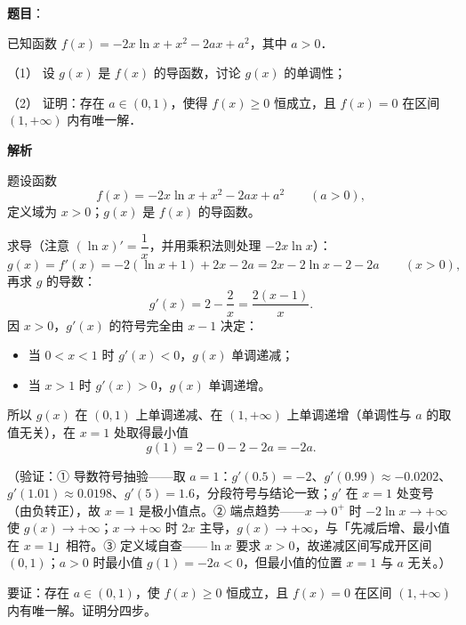 \begin{answer}

\textbf{题目}：

已知函数 \(f(x)=-2x\ln x+x^2-2ax+a^2\)，其中 \(a>0\)．

（1） 设 \(g(x)\) 是 \(f(x)\) 的导函数，讨论 \(g(x)\) 的单调性；

（2） 证明：存在 \(a\in(0,1)\)，使得 \(f(x)\geqslant 0\) 恒成立，且 \(f(x)=0\) 在区间 \((1,+\infty)\) 内有唯一解．

\textbf{解析}

题设函数
\nopagebreak[4]
\[
f(x)=-2x\ln x+x^{2}-2ax+a^{2}\qquad(a>0),
\]
定义域为 \(x>0\)；\(g(x)\) 是 \(f(x)\) 的导函数。


求导（注意 \((\ln x)'=\dfrac{1}{x}\)，并用乘积法则处理 \(-2x\ln x\)）：
\nopagebreak[4]
\[
g(x)=f'(x)=-2(\ln x+1)+2x-2a=2x-2\ln x-2-2a\qquad(x>0),
\]
再求 \(g\) 的导数：
\nopagebreak[4]
\[
g'(x)=2-\frac{2}{x}=\frac{2(x-1)}{x}.
\]
因 \(x>0\)，\(g'(x)\) 的符号完全由 \(x-1\) 决定：

\begin{itemize}
\item 当 \(0<x<1\) 时 \(g'(x)<0\)，\(g(x)\) 单调递减；
\item 当 \(x>1\) 时 \(g'(x)>0\)，\(g(x)\) 单调递增。
\end{itemize}

所以 \(g(x)\) 在 \((0,1)\) 上单调递减、在 \((1,+\infty)\) 上单调递增（单调性与 \(a\) 的取值无关），在 \(x=1\) 处取得最小值
\nopagebreak[4]
\[
g(1)=2-0-2-2a=-2a .
\]

（验证：① 导数符号抽验——取 \(a=1\)：\(g'(0.5)=-2\)、\(g'(0.99)\approx-0.0202\)、\(g'(1.01)\approx0.0198\)、\(g'(5)=1.6\)，分段符号与结论一致；\(g'\) 在 \(x=1\) 处变号（由负转正），故 \(x=1\) 是极小值点。② 端点趋势——\(x\to0^{+}\) 时 \(-2\ln x\to+\infty\) 使 \(g(x)\to+\infty\)；\(x\to+\infty\) 时 \(2x\) 主导，\(g(x)\to+\infty\)，与「先减后增、最小值在 \(x=1\)」相符。③ 定义域自查——\(\ln x\) 要求 \(x>0\)，故递减区间写成开区间 \((0,1)\)；\(a>0\) 时最小值 \(g(1)=-2a<0\)，但最小值的位置 \(x=1\) 与 \(a\) 无关。）


要证：存在 \(a\in(0,1)\)，使 \(f(x)\geqslant0\) 恒成立，且 \(f(x)=0\) 在区间 \((1,+\infty)\) 内有唯一解。证明分四步。


\end{answer}
